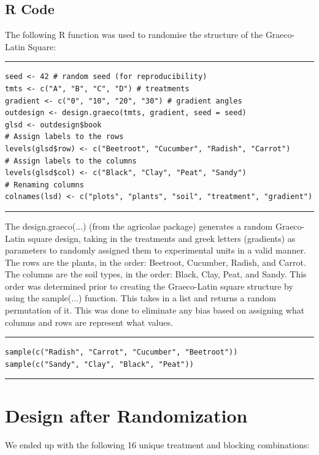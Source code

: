 \documentclass{article}
\begin{document}
\subsection{R Code}
The following R function was used to randomise the structure of the Graeco-Latin Square: 
\par\noindent\rule{\textwidth}{0.4pt}
\vspace{-25pt} %
\begin{verbatim}
seed <- 42 # random seed (for reproducibility)
tmts <- c("A", "B", "C", "D") # treatments
gradient <- c("0", "10", "20", "30") # gradient angles
outdesign <- design.graeco(tmts, gradient, seed = seed) 
glsd <- outdesign$book
# Assign labels to the rows
levels(glsd$row) <- c("Beetroot", "Cucumber", "Radish", "Carrot")
# Assign labels to the columns
levels(glsd$col) <- c("Black", "Clay", "Peat", "Sandy")
# Renaming columns
colnames(lsd) <- c("plots", "plants", "soil", "treatment", "gradient")  
\end{verbatim}
\vspace{-15pt} %
\par\noindent\rule{\textwidth}{0.4pt}
The design.graeco(...) (from the agricolae package) generates a random Graeco-Latin square design, taking in the treatments and greek letters (gradients) as parameters to randomly assigned them to experimental units in a valid manner. The rows are the plants, in the order: Beetroot, Cucumber, Radish, and Carrot. The columns are the soil types, in the order: Black, Clay, Peat, and Sandy. This order was determined prior to creating the Graeco-Latin square structure by using the sample(...) function. This takes in a list and returns a random permutation of it. This was done to eliminate any bias based on assigning what columns and rows are represent what values. 
\par\noindent\rule{\textwidth}{0.4pt}
\vspace{-25pt} %
\begin{verbatim}
sample(c("Radish", "Carrot", "Cucumber", "Beetroot"))
sample(c("Sandy", "Clay", "Black", "Peat"))
\end{verbatim}
\vspace{-15pt} %
\par\noindent\rule{\textwidth}{0.4pt}

\section{Design after Randomization}
We ended up with the following 16 unique treatment and blocking combinations: \\
\end{document}
